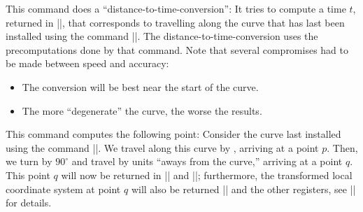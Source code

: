 \begin{command}{\pgfcurvilineardistancetotime{}}
  This command does a ``distance-to-time-conversion'': It tries to
  compute a time $t$, returned in |\pgf@x|, that corresponds to
  travelling  along the curve that has last been
  installed using the command   |\pgfsetcurvilinearbeziercurve|. The distance-to-time-conversion
  uses the precomputations done by that command. Note that several
  compromises had to be made between speed and accuracy:
  \begin{itemize}
  \item The conversion will be best near the start of the curve.
  \item The more ``degenerate'' the curve, the worse the results.
  \end{itemize}
\end{command}


\begin{command}{\pgfpointcurvilinearbezierorthogonal{}}
  This command computes the following point: Consider the curve
  last installed using the command |\pgfsetcurvilinearbeziercurve|. We
  travel along this curve by , arriving at a point
  $p$. Then, we turn by $90^\circ$ and travel by  units
  ``aways from the curve,'' arriving at a point $q$. This point $q$
  will now be returned in |\pgf@x| and |\pgf@y|; furthermore, the
  transformed local coordinate system at point $q$ will also be
  returned |\pgf@xa| and the other registers, see
  |\pgftransformnonlinear| for details.
  \makeatletter
\begin{codeexample}[]
\end{codeexample}

\begin{codeexample}[]
\end{codeexample}
\end{command}


